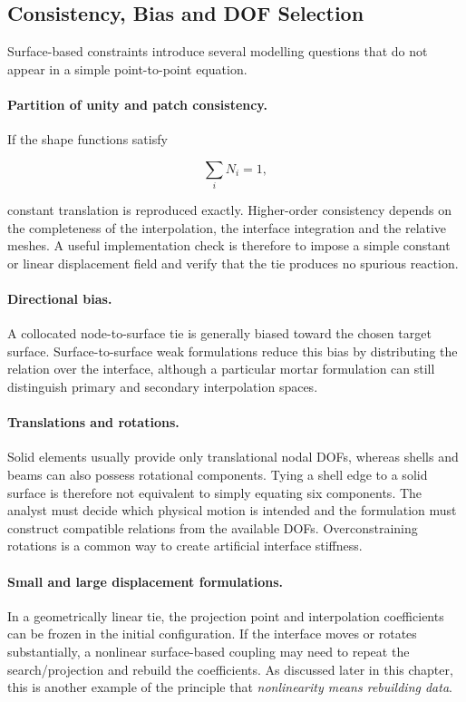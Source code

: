 \subsection{Consistency, Bias and DOF Selection}

Surface-based constraints introduce several modelling questions that do not
appear in a simple point-to-point equation.

\paragraph{Partition of unity and patch consistency.}
If the shape functions satisfy

\begin{equation}
    \sum_i N_i=1,
\end{equation}

constant translation is reproduced exactly. Higher-order consistency depends on
the completeness of the interpolation, the interface integration and the
relative meshes. A useful implementation check is therefore to impose a simple
constant or linear displacement field and verify that the tie produces no
spurious reaction.

\paragraph{Directional bias.}
A collocated node-to-surface tie is generally biased toward the chosen target
surface. Surface-to-surface weak formulations reduce this bias by distributing
the relation over the interface, although a particular mortar formulation can
still distinguish primary and secondary interpolation spaces.

\paragraph{Translations and rotations.}
Solid elements usually provide only translational nodal DOFs, whereas shells and
beams can also possess rotational components. Tying a shell edge to a solid
surface is therefore not equivalent to simply equating six components. The
analyst must decide which physical motion is intended and the formulation must
construct compatible relations from the available DOFs. Overconstraining
rotations is a common way to create artificial interface stiffness.

\paragraph{Small and large displacement formulations.}
In a geometrically linear tie, the projection point and interpolation
coefficients can be frozen in the initial configuration. If the interface moves
or rotates substantially, a nonlinear surface-based coupling may need to repeat
the search/projection and rebuild the coefficients. As discussed later in this
chapter, this is another example of the principle that \textit{nonlinearity
means rebuilding data}.

